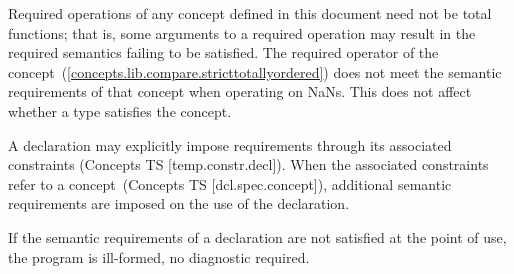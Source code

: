 \begin{addedblock}
\pnum
Required operations of any concept defined in this document need not be
total functions; that is, some arguments to a required operation may
result in the required semantics failing to be satisfied. \enterexample
The required \tcode{<} operator of the 
concept~(\ref{concepts.lib.compare.stricttotallyordered}) does not meet the
semantic requirements of that concept when operating on NaNs.\exitexample
This does not affect whether a type satisfies the concept.

\pnum
A declaration may explicitly impose requirements through its associated
constraints (Concepts TS [temp.constr.decl]). When the associated constraints
refer to a concept~(Concepts TS [dcl.spec.concept]), additional semantic requirements are
imposed on the use of the declaration.

\pnum
If the semantic requirements of a declaration are not satisfied at the
point of use, the program is ill-formed, no diagnostic required.
\end{addedblock}

\setcounter{section}{5}
\setcounter{subsection}{2}
\setcounter{subsubsection}{1}
\setcounter{paragraph}{4}

